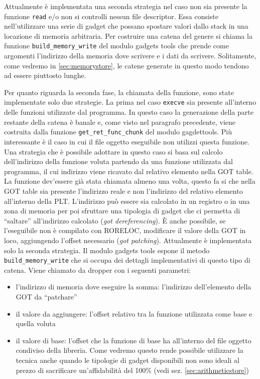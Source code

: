 Attualmente è implementata una seconda strategia nel caso non sia
presente la funzione \lstinline{read} e/o non si controlli nessun file
descriptor. Essa consiste nell'utilizzare una serie di gadget che
possano spostare valori dallo stack in una locazione di memoria
arbitraria.  Per costruire una catena del genere si chiama la funzione
\lstinline{build_memory_write} del modulo gadgets tools che prende
come argomenti l'indirizzo della memoria dove scrivere e i dati da
scrivere. Solitamente, come vedremo in \ref{sec:memorystore}, le
catene generate in questo modo tendono ad essere piuttosto lunghe.


Per quanto riguarda la seconda fase, la chiamata della funzione, sono
state implementate solo due strategie. La prima nel caso
\lstinline{execve} sia presente all'interno delle funzioni utilizzate
dal programma. In questo caso la generazione della parte restante
della catena è banale e, come visto nel paragrafo precedente, viene
costruita dalla funzione \lstinline{get_ret_func_chunk} del modulo
gagdettools. Più interessante è il caso in cui il file oggetto
eseguibile non utilizzi questa funzione. Una strategia che è possibile
adottare in questo caso si basa sul calcolo dell'indirizzo della
funzione voluta partendo da una funzione utilizzata dal programma, il
cui indirizzo viene ricavato dal relativo elemento nella GOT table. La
funzione dev'essere già stata chiamata almeno una volta, questo fa si
che nella GOT table sia presente l'indirizzo reale e non l'indirizzo
del relativo elemento all'interno della PLT. L'indirizzo può essere
sia calcolato in un registro o in una zona di memoria per poi
sfruttare una tipologia di gadget che ci permetta di ``saltare''
all'indirizzo calcolato (\emph{got dereferencing}). È anche possibile,
se l'eseguibile non è compilato con RORELOC, modificare il valore
della GOT in loco, aggiungendo l'offset necessario (\emph{got
  patching}). Attualmente è implementata solo la seconda strategia. Il
modulo gadgets tools espone il metodo \lstinline{build_memory_write} che
si occupa dei dettagli implementativi di questo tipo di catena. Viene
chiamato da dropper con i seguenti parametri:

\begin{itemize}
  \item l'indirizzo di memoria dove eseguire la somma: l'indirizzo
    dell'elemento della GOT da ``patchare''

  \item il valore da aggiungere: l'offset relativo tra la funzione
    utilizzata come base e quella voluta

  \item il valore di base: l'offset che la funzione di base ha
    all'interno del file oggetto condiviso della libreria. Come
    vedremo questo rende possibile utilizzare la tecnica anche quando
    le tipologie di gadget disponibili non sono ideali al prezzo di
    sacrificare un'affidabilità del 100\% (vedi
    sez. \ref{sec:arithmeticstore})

\end{itemize}

